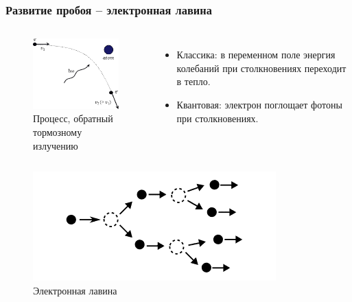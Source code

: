 \documentclass{beamer}
\begin{document}
		
	\begin{frame}
		\frametitle{Развитие пробоя -- электронная лавина}
		
		\begin{columns}
			\begin{figure}
				\centering
				\includegraphics[width=0.7\linewidth]{res/inverse_bremsstrahlung.png}
				\caption*{Процесс, обратный тормозному излучению}
			\end{figure}
			\begin{itemize}
				\item Классика: в переменном поле энергия колебаний при столкновениях переходит в тепло.
				\item Квантовая: электрон поглощает фотоны при столкновениях.
			\end{itemize}
		\end{columns}
		\begin{columns}
			\column{0.5\linewidth}
			\begin{figure}
				\centering
				\includegraphics[width=0.8\linewidth]{res/electron_avalanche.png}
				\caption*{Электронная лавина}
			\end{figure}
		

\end{columns}
\end{frame}
\end{document}
